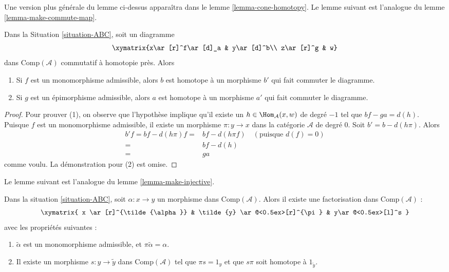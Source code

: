 \noindent
Une version plus générale du lemme ci-dessus apparaîtra dans le lemme
\ref{lemma-cone-homotopy}. Le lemme suivant est l'analogue du lemme
\ref{lemma-make-commute-map}.

\begin{lemma}
\label{lemma-homo-change}
Dans la Situation \ref{situation-ABC}, soit un diagramme
$$
\xymatrix{x\ar[r]^f\ar[d]_a & y\ar[d]^b\\
z\ar[r]^g & w}
$$
dans $\text{Comp}(\mathcal{A})$ commutatif à homotopie près. Alors
\begin{enumerate}
\item Si $f$ est un monomorphisme admissible, alors $b$ est homotope à un
morphisme $b'$ qui fait commuter le diagramme.
\item Si $g$ est un épimorphisme admissible, alors $a$ est homotope à un morphisme
$a'$ qui fait commuter le diagramme.
\end{enumerate}
\end{lemma}

\begin{proof}
Pour prouver (1), on observe que l'hypothèse implique qu'il existe un
$h\in\Hom_{\mathcal{A}}(x,w)$ de degré $-1$ tel que $bf-ga=d(h)$. Puisque $f$ est
un monomorphisme admissible, il existe un morphisme $\pi : y \to x$ dans la
catégorie $\mathcal{A}$ de degré $0$. Soit $b' = b - d(h\pi)$. Alors
\begin{align*}
b'f = bf - d(h\pi)f
= &
bf - d(h\pi f) \quad (\text{puisque }d(f) = 0) \\
= &
bf-d(h) \\
= &
ga
\end{align*}
comme voulu. La démonstration pour (2) est omise.
\end{proof}

\noindent
Le lemme suivant est l'analogue du lemme \ref{lemma-make-injective}.

\begin{lemma}
\label{lemma-factor}
Dans la situation \ref{situation-ABC}, soit $\alpha : x \to y$ un morphisme dans
$\text{Comp}(\mathcal{A})$. Alors il existe une factorisation dans
$\text{Comp}(\mathcal{A})$ :
$$
\xymatrix{
x \ar[r]^{\tilde{\alpha}}  &
\tilde{y} \ar@<0.5ex>[r]^{\pi} &
y\ar@<0.5ex>[l]^s
}
$$
avec les propriétés suivantes :
\begin{enumerate}
\item $\tilde{\alpha}$ est un monomorphisme admissible, et
$\pi\tilde{\alpha}=\alpha$.
\item Il existe un morphisme $s:y\to\tilde{y}$ dans $\text{Comp}(\mathcal{A})$ tel
que $\pi s=1_y$ et que $s\pi$ soit homotope à $1_{\tilde{y}}$.
\end{enumerate}
\end{lemma}

